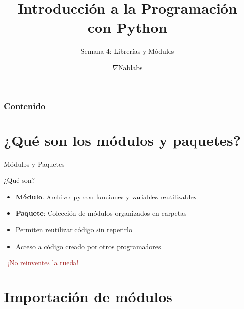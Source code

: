 \documentclass{beamer}
\title{\textbf{Introducción a la Programación con Python}}
\subtitle{Semana 4: Librerías y Módulos}
\author{$\nabla$Nablabs}
\date{}
\begin{document}
\begin{frame}
\titlepage
\end{frame}

\begin{frame}
\frametitle{Contenido}
\tableofcontents
\end{frame}

\section{¿Qué son los módulos y paquetes?}

\begin{frame}{Módulos y Paquetes \faBoxOpen}
\begin{conceptbox}{¿Qué son?}
\small
\begin{itemize}
    \item[\faCube] \textbf{Módulo}: Archivo .py con funciones y variables reutilizables
    \item[\faBoxes] \textbf{Paquete}: Colección de módulos organizados en carpetas
    \item[\faRecycle] Permiten reutilizar código sin repetirlo
    \item[\faUsers] Acceso a código creado por otros programadores
\end{itemize}
\end{conceptbox}

\vspace{0.2cm}
\begin{center}
\large\textcolor{brown}{\faBook\ ¡No reinventes la rueda!}
\end{center}
\end{frame}

\section{Importación de módulos}
\end{document}
